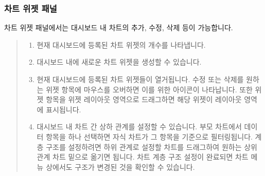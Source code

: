\documentclass[letterpaper,10pt,english]{sphinxmanual}
\begin{document}
\subsubsection{차트 위젯 패널}
\label{\detokenize{discovery/part04/change_dashboard_layout_and_size:id3}}
차트 위젯 패널에서는 대시보드 내 차트의 추가, 수정, 삭제 등이 가능합니다.
\begin{quote}

\begin{figure}[H]
\centering

\noindent{}
\end{figure}
\begin{enumerate}
\def\theenumi{\arabic{enumi}}
\def\labelenumi{\theenumi .}
\makeatletter\def\p@enumii{\p@enumi \theenumi .}\makeatother
\item {} 
 현재 대시보드에 등록된 차트 위젯의 개수를 나타냅니다.

\item {} 
 대시보드 내에 새로운 차트 위젯을 생성할 수 있습니다.

\item {} 
 현재 대시보드에 등록된 차트 위젯들이 열거됩니다. 수정 또는 삭제를 원하는 위젯 항목에 마우스를 오버하면 이를 위한 아이콘이 나타납니다. 또한 위젯 항목을 위젯 레이아웃 영역으로 드래그하면 해당 위젯이 레이아웃 영역에 표시됩니다.

\item {} 
 대시보드 내 차트 간 상하 관계를 설정할 수 있습니다. 부모 차트에서 데이터 항목을 하나 선택하면 자식 차트가 그 항목을 기준으로 필터링됩니다. 계층 구조를 설정하려면 하위 관계로 설정할 차트를 드래그하여 원하는 상위 관계 차트 밑으로 옮기면 됩니다. 차트 계층 구조 설정이 완료되면 차트 메뉴 상에서도 구조가 변경된 것을 확인할 수 있습니다.

\end{enumerate}
\end{quote}
\end{document}
